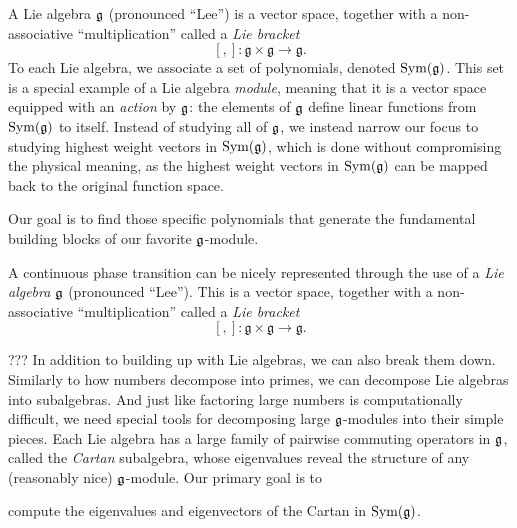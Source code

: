 \documentclass[11pt, reqno]{amsart}
\begin{document}
A Lie algebra $\mathfrak{g}$ (pronounced ``Lee'') is a vector space, together with a non-associative ``multiplication'' called a \emph{Lie bracket}
\[[,]: \mathfrak{g} \times \mathfrak{g} \rightarrow \mathfrak{g}.\]
To each Lie algebra, we associate a set of polynomials, denoted $\operatorname{Sym}(\mathfrak{g})$. This set is a special example of a Lie algebra \emph{module}, meaning that it is a vector space equipped with an \emph{action} by $\mathfrak{g}$: the elements of $\mathfrak{g}$ define linear functions from $\operatorname{Sym}(\mathfrak{g})$ to itself. Instead of studying all of $\mathfrak{g}$, we instead narrow our focus to studying highest weight vectors in $\operatorname{Sym}(\mathfrak{g})$, which is done without compromising the physical meaning, as the highest weight vectors in $\operatorname{Sym}(\mathfrak{g})$ can be mapped back to the original function space. 

Our goal is to find those specific polynomials that generate the fundamental building blocks of our favorite $\mathfrak{g}$-module.



A continuous phase transition can be nicely represented through the use of a \emph{Lie algebra} $\mathfrak{g}$ (pronounced ``Lee''). This is a vector space, together with a non-associative ``multiplication'' called a \emph{Lie bracket}
\[[,]: \mathfrak{g} \times \mathfrak{g} \rightarrow \mathfrak{g}.\]



??? In addition to building up with Lie algebras, we can also break them down.
Similarly to how numbers decompose into primes, we can decompose Lie algebras into subalgebras. And just like factoring large numbers is computationally difficult, we need special tools for decomposing large $\mathfrak{g}$-modules into their simple pieces. Each Lie algebra has a large family of pairwise commuting operators in $\mathfrak{g}$, called the \emph{Cartan} subalgebra, whose eigenvalues reveal the structure of any (reasonably nice) $\mathfrak{g}$-module. Our primary goal is to
\begin{center} compute the eigenvalues and eigenvectors of the Cartan in $\operatorname{Sym}(\mathfrak{g})$. \end{center}




%
%

%
%
%
\end{document}
